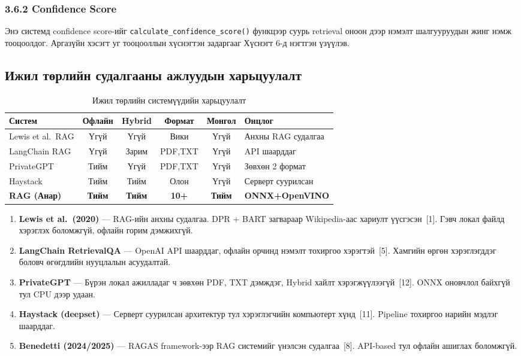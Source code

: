 \documentclass[11pt,a4paper]{article}
\begin{document}
\subsubsection*{3.6.2 Confidence Score}

Энэ системд confidence score-ийг \texttt{calculate\_confidence\_score()} функцээр
суурь retrieval оноон дээр нэмэлт шалгууруудын жинг нэмж тооцоолдог.
Аргазүйн хэсэгт уг тооцооллын хүснэгтэн задаргааг
Хүснэгт 6-д нэгтгэн үзүүлэв.

\subsection{Ижил төрлийн судалгааны ажлуудын харьцуулалт}

\begin{table}[H]
\centering
\caption{Ижил төрлийн системүүдийн харьцуулалт}
\label{tab:comparison}
\small
\begin{tabularx}{\textwidth}{|l|c|c|c|c|X|}
\hline
\textbf{Систем} & \textbf{Офлайн} & \textbf{Hybrid} & \textbf{Формат} & \textbf{Монгол} & \textbf{Онцлог} \\
\hline
Lewis et al.\ RAG & Үгүй & Үгүй & Вики & Үгүй & Анхны RAG судалгаа \\
\hline
LangChain RAG & Үгүй & Зарим & PDF,TXT & Үгүй & API шаарддаг \\
\hline
PrivateGPT & Тийм & Үгүй & PDF,TXT & Үгүй & Зөвхөн 2 формат \\
\hline
Haystack & Тийм & Тийм & Олон & Үгүй & Серверт суурилсан \\
\hline
\textbf{RAG (Анар)} & \textbf{Тийм} & \textbf{Тийм} & \textbf{10+} & \textbf{Тийм} & \textbf{ONNX+OpenVINO} \\
\hline
\end{tabularx}
\end{table}

\begin{enumerate}
    \item \textbf{Lewis et al.\ (2020)} — RAG-ийн анхны судалгаа. DPR + BART загвараар Wikipedia-аас хариулт үүсгэсэн~[1]. Гэвч локал файлд хэрэглэх боломжгүй, офлайн горим дэмжихгүй.
    \item \textbf{LangChain RetrievalQA} — OpenAI API шаарддаг, офлайн орчинд нэмэлт тохиргоо хэрэгтэй~[5]. Хамгийн өргөн хэрэглэгддэг боловч өгөгдлийн нууцлалын асуудалтай.
    \item \textbf{PrivateGPT} — Бүрэн локал ажилладаг ч зөвхөн PDF, TXT дэмждэг, Hybrid хайлт хэрэгжүүлээгүй~[12]. ONNX оновчлол байхгүй тул CPU дээр удаан.
    \item \textbf{Haystack (deepset)} — Серверт суурилсан архитектур тул хэрэглэгчийн компьютерт хүнд~[11]. Pipeline тохиргоо нарийн мэдлэг шаарддаг.
    \item \textbf{Benedetti (2024/2025)} — RAGAS framework-ээр RAG системийг үнэлсэн судалгаа~[8]. API-based тул офлайн ашиглах боломжгүй.
\end{enumerate}
\end{document}
